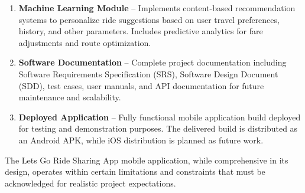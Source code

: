 \begin{enumerate}
    \item \textbf{Machine Learning Module} – Implements content-based recommendation systems to personalize ride suggestions based on user travel preferences, history, and other parameters. Includes predictive analytics for fare adjustments and route optimization.
    
    \item \textbf{Software Documentation} – Complete project documentation including Software Requirements Specification (SRS), Software Design Document (SDD), test cases, user manuals, and API documentation for future maintenance and scalability.
    
    \item \textbf{Deployed Application} – Fully functional mobile application build deployed for testing and demonstration purposes. The delivered build is distributed as an Android APK, while iOS distribution is planned as future work.
\end{enumerate}


The Lets Go Ride Sharing App mobile application, while comprehensive in its design, operates within certain limitations and constraints that must be acknowledged for realistic project expectations.

